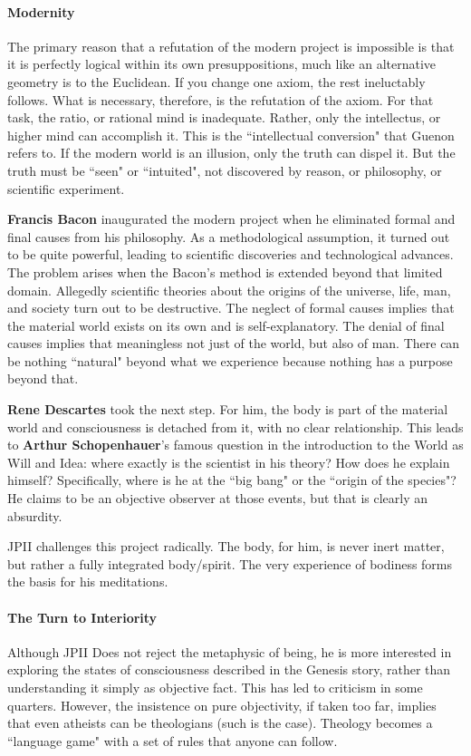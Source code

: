 \paragraph{Modernity}
The primary reason that a refutation of the modern project is impossible is that it is perfectly logical within its own presuppositions, much like an alternative geometry is to the Euclidean. If you change one axiom, the rest ineluctably follows. What is necessary, therefore, is the refutation of the axiom. For that task, the ratio, or rational mind is inadequate. Rather, only the intellectus, or higher mind can accomplish it. This is the ``intellectual conversion" that Guenon refers to. If the modern world is an illusion, only the truth can dispel it. But the truth must be ``seen" or ``intuited", not discovered by reason, or philosophy, or scientific experiment.

\textbf{Francis Bacon} inaugurated the modern project when he eliminated formal and final causes from his philosophy. As a methodological assumption, it turned out to be quite powerful, leading to scientific discoveries and technological advances. The problem arises when the Bacon's method is extended beyond that limited domain. Allegedly scientific theories about the origins of the universe, life, man, and society turn out to be destructive. The neglect of formal causes implies that the material world exists on its own and is self-explanatory. The denial of final causes implies that meaningless not just of the world, but also of man. There can be nothing ``natural" beyond what we experience because nothing has a purpose beyond that.

\textbf{Rene Descartes} took the next step. For him, the body is part of the material world and consciousness is detached from it, with no clear relationship. This leads to \textbf{Arthur Schopenhauer}'s famous question in the introduction to the World as Will and Idea: where exactly is the scientist in his theory? How does he explain himself? Specifically, where is he at the ``big bang" or the ``origin of the species"? He claims to be an objective observer at those events, but that is clearly an absurdity.

JPII challenges this project radically. The body, for him, is never inert matter, but rather a fully integrated body/spirit. The very experience of bodiness forms the basis for his meditations.

\paragraph{The Turn to Interiority}
Although JPII Does not reject the metaphysic of being, he is more interested in exploring the states of consciousness described in the Genesis story, rather than understanding it simply as objective fact. This has led to criticism in some quarters. However, the insistence on pure objectivity, if taken too far, implies that even atheists can be theologians (such is the case). Theology becomes a ``language game" with a set of rules that anyone can follow.

